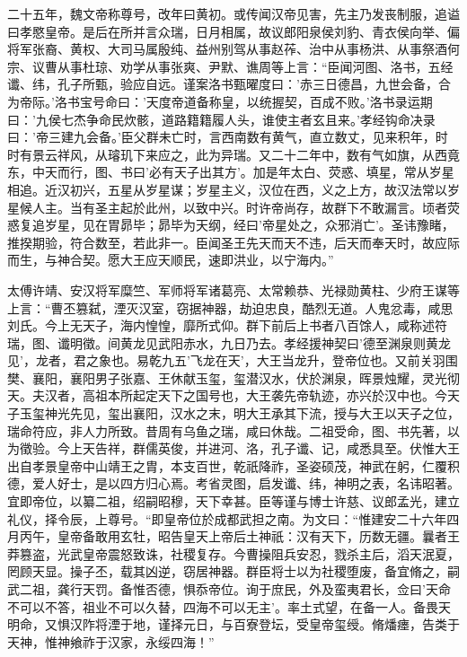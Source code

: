 \documentclass[12pt,UTF8]{ctexbook}
\begin{document}
二十五年，魏文帝称尊号，改年曰黄初。或传闻汉帝见害，先主乃发丧制服，追谥曰孝愍皇帝。是后在所并言众瑞，日月相属，故议郎阳泉侯刘豹、青衣侯向举、偏将军张裔、黄权、大司马属殷纯、益州别驾从事赵莋、治中从事杨洪、从事祭酒何宗、议曹从事杜琼、劝学从事张爽、尹默、谯周等上言：“臣闻河图、洛书，五经谶、纬，孔子所甄，验应自远。谨案洛书甄曜度曰：'赤三日德昌，九世会备，合为帝际。'洛书宝号命曰：'天度帝道备称皇，以统握契，百成不败。'洛书录运期曰：'九侯七杰争命民炊骸，道路籍籍履人头，谁使主者玄且来。'孝经钩命决录曰：'帝三建九会备。'臣父群未亡时，言西南数有黄气，直立数丈，见来积年，时时有景云祥风，从璿玑下来应之，此为异瑞。又二十二年中，数有气如旗，从西竟东，中天而行，图、书曰'必有天子出其方'。加是年太白、荧惑、填星，常从岁星相追。近汉初兴，五星从岁星谋；岁星主义，汉位在西，义之上方，故汉法常以岁星候人主。当有圣主起於此州，以致中兴。时许帝尚存，故群下不敢漏言。顷者荧惑复追岁星，见在胃昴毕；昴毕为天纲，经曰'帝星处之，众邪消亡'。圣讳豫睹，推揆期验，符合数至，若此非一。臣闻圣王先天而天不违，后天而奉天时，故应际而生，与神合契。愿大王应天顺民，速即洪业，以宁海内。”

太傅许靖、安汉将军糜竺、军师将军诸葛亮、太常赖恭、光禄勋黄柱、少府王谋等上言：“曹丕篡弑，湮灭汉室，窃据神器，劫迫忠良，酷烈无道。人鬼忿毒，咸思刘氏。今上无天子，海内惶惶，靡所式仰。群下前后上书者八百馀人，咸称述符瑞，图、谶明徵。间黄龙见武阳赤水，九日乃去。孝经援神契曰'德至渊泉则黄龙见'，龙者，君之象也。易乾九五'飞龙在天'，大王当龙升，登帝位也。又前关羽围樊、襄阳，襄阳男子张嘉、王休献玉玺，玺潜汉水，伏於渊泉，晖景烛耀，灵光彻天。夫汉者，高祖本所起定天下之国号也，大王袭先帝轨迹，亦兴於汉中也。今天子玉玺神光先见，玺出襄阳，汉水之末，明大王承其下流，授与大王以天子之位，瑞命符应，非人力所致。昔周有乌鱼之瑞，咸曰休哉。二祖受命，图、书先著，以为徵验。今上天告祥，群儒英俊，并进河、洛，孔子谶、记，咸悉具至。伏惟大王出自孝景皇帝中山靖王之胄，本支百世，乾祇降祚，圣姿硕茂，神武在躬，仁覆积德，爱人好士，是以四方归心焉。考省灵图，启发谶、纬，神明之表，名讳昭著。宜即帝位，以纂二祖，绍嗣昭穆，天下幸甚。臣等谨与博士许慈、议郎孟光，建立礼仪，择令辰，上尊号。“即皇帝位於成都武担之南。为文曰：“惟建安二十六年四月丙午，皇帝备敢用玄牡，昭告皇天上帝后土神祇：汉有天下，历数无疆。曩者王莽篡盗，光武皇帝震怒致诛，社稷复存。今曹操阻兵安忍，戮杀主后，滔天泯夏，罔顾天显。操子丕，载其凶逆，窃居神器。群臣将士以为社稷堕废，备宜脩之，嗣武二祖，龚行天罚。备惟否德，惧忝帝位。询于庶民，外及蛮夷君长，佥曰'天命不可以不答，祖业不可以久替，四海不可以无主'。率土式望，在备一人。备畏天明命，又惧汉阼将湮于地，谨择元日，与百寮登坛，受皇帝玺绶。脩燔瘗，告类于天神，惟神飨祚于汉家，永绥四海！”
\end{document}

